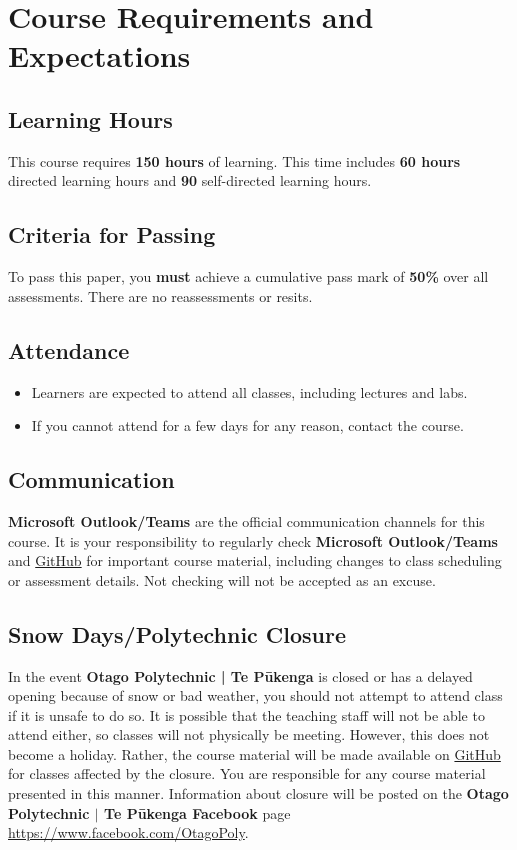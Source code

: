 \documentclass{article}
\begin{document}
\section*{Course Requirements and Expectations}

\subsection*{Learning Hours}
This course requires \textbf{150 hours} of learning. This time includes \textbf{60 hours} directed learning hours and \textbf{90} self-directed learning hours.

\subsection*{Criteria for Passing}
To pass this paper, you \textbf{must} achieve a cumulative pass mark of \textbf{50\%} over all assessments. There are no reassessments or resits.

\subsection*{Attendance}
\begin{itemize}
	\item Learners are expected to attend all classes, including lectures and labs.
	\item If you cannot attend for a few days for any reason, contact the course.
\end{itemize}

\subsection*{Communication}
\textbf{Microsoft Outlook/Teams} are the official communication channels for this course. It is your responsibility to regularly check \textbf{Microsoft Outlook/Teams} and \href{https://github.com/otago-polytechnic-bit-courses/ID608001-intermediate-app-dev-concepts}{GitHub} for important course material, including changes to class scheduling or assessment details. Not checking will not be accepted as an excuse.

\subsection*{Snow Days/Polytechnic Closure}
In the event \textbf{Otago Polytechnic | Te Pūkenga} is closed or has a delayed opening because of snow or bad weather, you should not attempt to attend class if it is unsafe to do so. It is possible that the teaching staff will not be able to attend either, so classes will not physically be meeting. However, this does not become a holiday. Rather, the course material will be made available on \href{https://github.com/otago-polytechnic-bit-courses/ID608001-intermediate-app-dev-concepts}{GitHub} for classes affected by the closure. You are responsible for any course material presented in this manner. Information about closure will be posted on the \textbf{Otago Polytechnic $|$ Te Pūkenga Facebook} page \href{https://www.facebook.com/OtagoPoly}{https://www.facebook.com/OtagoPoly}.
\end{document}
